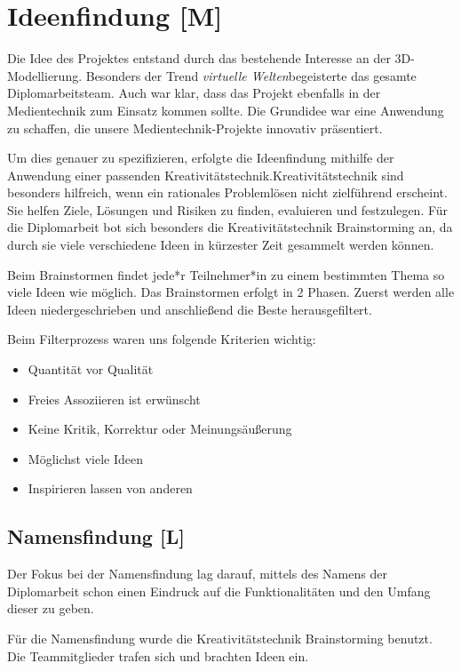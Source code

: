 
\section{Ideenfindung [M]}

Die Idee des Projektes entstand durch das bestehende Interesse an der 3D-Modellierung. Besonders der Trend \emph{virtuelle Welten}begeisterte das gesamte Diplomarbeitsteam. Auch war klar, dass das Projekt ebenfalls in der Medientechnik zum Einsatz kommen sollte. Die Grundidee war eine Anwendung zu schaffen, die unsere Medientechnik-Projekte innovativ präsentiert.

Um dies genauer zu spezifizieren, erfolgte die Ideenfindung mithilfe der Anwendung einer passenden Kreativitätstechnik.Kreativitätstechnik sind besonders hilfreich, wenn ein rationales Problemlösen nicht zielführend erscheint. Sie helfen Ziele, Lösungen und Risiken zu finden, evaluieren und festzulegen. Für die Diplomarbeit bot sich besonders die Kreativitätstechnik Brainstorming an, da durch sie viele verschiedene Ideen in kürzester Zeit gesammelt werden können. \cite{Ideenfindung}

Beim Brainstormen findet jede*r Teilnehmer*in zu einem bestimmten Thema so viele Ideen wie möglich. Das Brainstormen erfolgt in 2 Phasen. Zuerst werden alle Ideen niedergeschrieben und anschließend die Beste herausgefiltert.  

Beim Filterprozess waren uns folgende Kriterien wichtig:
\begin{itemize}
    \item Quantität vor Qualität
    \item Freies Assoziieren ist erwünscht
    \item Keine Kritik, Korrektur oder Meinungsäußerung
    \item Möglichst viele Ideen
    \item Inspirieren lassen von anderen \cite{Ideenfindung}
\end{itemize}


\subsection{Namensfindung [L]}
Der Fokus bei der Namensfindung lag darauf, mittels des Namens der Diplomarbeit schon einen Eindruck auf die Funktionalitäten und den Umfang dieser zu geben.

Für die Namensfindung wurde die Kreativitätstechnik Brainstorming benutzt. Die Teammitglieder trafen sich und brachten Ideen ein.

